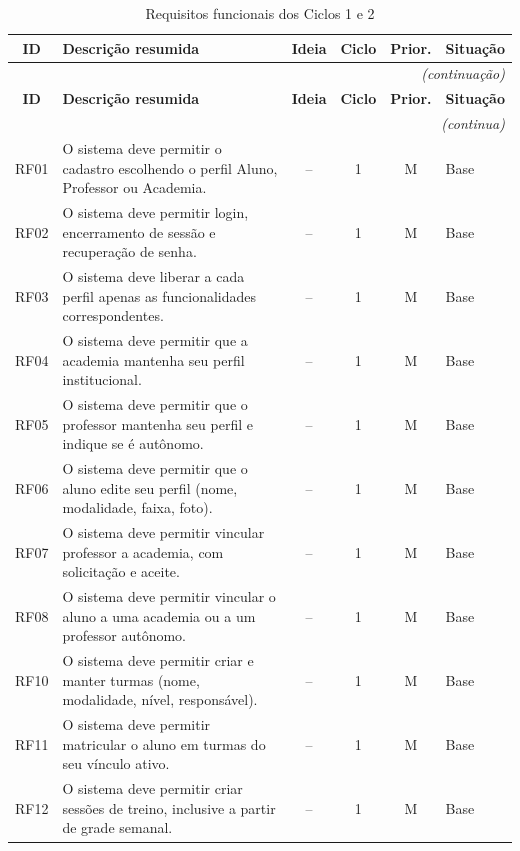\begin{quadrolongo}
\begin{longtable}{|c|p{7.3cm}|c|c|c|p{1.6cm}|}
  \caption{Requisitos funcionais dos Ciclos 1 e 2}\label{qua:rf}\\
  \hline
  \textbf{ID} & \textbf{Descrição resumida} & \textbf{Ideia} & \textbf{Ciclo} & \textbf{Prior.} & \textbf{Situação} \\ \hline
\endfirsthead
  \multicolumn{6}{r}{\textit{(continuação)}}\\
  \hline
  \textbf{ID} & \textbf{Descrição resumida} & \textbf{Ideia} & \textbf{Ciclo} & \textbf{Prior.} & \textbf{Situação} \\ \hline
\endhead
  \multicolumn{6}{r}{\textit{(continua)}}\\
\endfoot
\endlastfoot
    RF01 & O sistema deve permitir o cadastro escolhendo o perfil Aluno, Professor ou Academia. & -- & 1 & M & Base \\ \hline
    RF02 & O sistema deve permitir login, encerramento de sessão e recuperação de senha. & -- & 1 & M & Base \\ \hline
    RF03 & O sistema deve liberar a cada perfil apenas as funcionalidades correspondentes. & -- & 1 & M & Base \\ \hline
    RF04 & O sistema deve permitir que a academia mantenha seu perfil institucional. & -- & 1 & M & Base \\ \hline
    RF05 & O sistema deve permitir que o professor mantenha seu perfil e indique se é autônomo. & -- & 1 & M & Base \\ \hline
    RF06 & O sistema deve permitir que o aluno edite seu perfil (nome, modalidade, faixa, foto). & -- & 1 & M & Base \\ \hline
    RF07 & O sistema deve permitir vincular professor a academia, com solicitação e aceite. & -- & 1 & M & Base \\ \hline
    RF08 & O sistema deve permitir vincular o aluno a uma academia ou a um professor autônomo. & -- & 1 & M & Base \\ \hline
    RF10 & O sistema deve permitir criar e manter turmas (nome, modalidade, nível, responsável). & -- & 1 & M & Base \\ \hline
    RF11 & O sistema deve permitir matricular o aluno em turmas do seu vínculo ativo. & -- & 1 & M & Base \\ \hline
    RF12 & O sistema deve permitir criar sessões de treino, inclusive a partir de grade semanal. & -- & 1 & M & Base \\ \hline

\end{longtable}
\end{quadrolongo}
